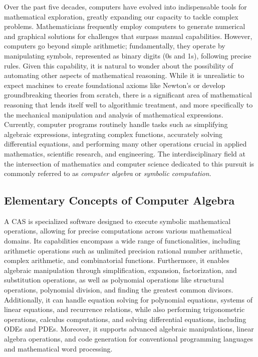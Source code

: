 Over the past five decades, computers have evolved into indispensable tools for mathematical exploration, greatly expanding our capacity to tackle complex problems. Mathematicians frequently employ computers to generate numerical and graphical solutions for challenges that surpass manual capabilities. However, computers go beyond simple arithmetic; fundamentally, they operate by manipulating symbols, represented as binary digits (0s and 1s), following precise rules. Given this capability, it is natural to wonder about the possibility of automating other aspects of mathematical reasoning. While it is unrealistic to expect machines to create foundational axioms like Newton's or develop groundbreaking theories from scratch, there is a significant area of mathematical reasoning that lends itself well to algorithmic treatment, and more specifically to the mechanical manipulation and analysis of mathematical expressions. Currently, computer programs routinely handle tasks such as simplifying algebraic expressions, integrating complex functions, accurately solving differential equations, and performing many other operations crucial in applied mathematics, scientific research, and engineering. The interdisciplinary field at the intersection of mathematics and computer science dedicated to this pursuit is commonly referred to as \emph{computer algebra} or \emph{symbolic computation}.

\subsection{Elementary Concepts of Computer Algebra}

A \ac{CAS} is specialized software designed to execute symbolic mathematical operations, allowing for precise computations across various mathematical domains. Its capabilities encompass a wide range of functionalities, including arithmetic operations such as unlimited precision rational number arithmetic, complex arithmetic, and combinatorial functions. Furthermore, it enables algebraic manipulation through simplification, expansion, factorization, and substitution operations, as well as polynomial operations like structural operations, polynomial division, and finding the greatest common divisors. Additionally, it can handle equation solving for polynomial equations, systems of linear equations, and recurrence relations, while also performing trigonometric operations, calculus computations, and solving differential equations, including \acp{ODE} and \acp{PDE}. Moreover, it supports advanced algebraic manipulations, linear algebra operations, and code generation for conventional programming languages and mathematical word processing.

